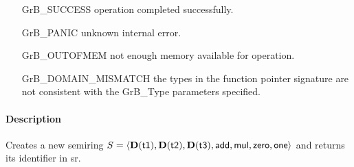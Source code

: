 \begin{itemize}[leftmargin=2.1in]
\item[{\sf GrB\_SUCCESS}]           operation completed successfully.
\item[{\sf GrB\_PANIC}]             unknown internal error.
\item[{\sf GrB\_OUTOFMEM}]          not enough memory available for operation.
\item[{\sf GrB\_DOMAIN\_MISMATCH}]  the types in the function pointer signature are not   
                                    consistent with the {\sf GrB\_Type} parameters specified.
\end{itemize}

\paragraph{Description}

Creates a new semiring $S = \langle \bold{D}({\sf t1}), \bold{D}({\sf t2}), 
\bold{D}({\sf t3}), {\sf add}, {\sf mul}, {\sf zero}, {\sf one} \rangle$ and 
returns its identifier in {\sf sr}.

